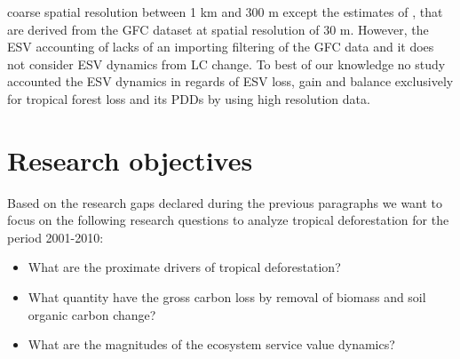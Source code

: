 coarse spatial resolution between 1 km and 300 m except the estimates of \citeauthor{Song2018}, that are derived from the \ac{GFC} dataset at spatial resolution of 30 m. However, the \ac{ESV} accounting of \citeauthor{Song2018} lacks of an importing filtering of the \ac{GFC} data and it does not consider \ac{ESV} dynamics from \ac{LC} change. To best of our knowledge no study accounted the \ac{ESV} dynamics in regards of \ac{ESV} loss, gain and balance exclusively for tropical forest loss and its \acp{PDD} by using high resolution data.

	\section{Research objectives}
		Based on the research gaps declared during the previous paragraphs we want to focus on the following research questions to analyze tropical deforestation for the period 2001-2010:
		\begin{itemize}
			\item What are the proximate drivers of tropical deforestation?
			\item What quantity have the gross carbon loss by removal of biomass and soil organic carbon change?
			\item What are the magnitudes of the ecosystem service value dynamics?
		\end{itemize}


